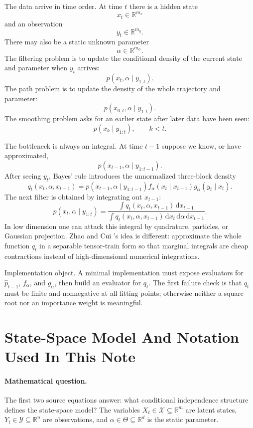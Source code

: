 \documentclass[11pt]{article}
\numberwithin{equation}{section}
\newcommand{\R}{\mathbb R}
\newcommand{\dd}{\,\mathrm d}
\begin{document}
The data arrive in time order.  At time \(t\) there is a hidden state
\[
    x_t\in \R^{m_x}
\]
and an observation
\[
    y_t\in \R^{m_y}.
\]
There may also be a static unknown parameter
\[
    \alpha\in \R^{m_\alpha}.
\]
The filtering problem is to update the conditional density of the current state
and parameter when \(y_t\) arrives:
\[
    p(x_t,\alpha\mid y_{1:t}).
\]
The path problem is to update the density of the whole trajectory and parameter:
\[
    p(x_{0:t},\alpha\mid y_{1:t}).
\]
The smoothing problem asks for an earlier state after later data have been seen:
\[
    p(x_k\mid y_{1:t}),\qquad k<t.
\]

The bottleneck is always an integral.  At time \(t-1\) suppose we know, or have
approximated,
\[
    p(x_{t-1},\alpha\mid y_{1:t-1}).
\]
After seeing \(y_t\), Bayes' rule introduces the unnormalized three-block
density
\[
    q_t(x_t,\alpha,x_{t-1})
    =
    p(x_{t-1},\alpha\mid y_{1:t-1})
    f_\alpha(x_t\mid x_{t-1})
    g_\alpha(y_t\mid x_t).
\]
The next filter is obtained by integrating out \(x_{t-1}\):
\[
    p(x_t,\alpha\mid y_{1:t})
    =
    \frac{\int q_t(x_t,\alpha,x_{t-1})\dd x_{t-1}}
    {\int q_t(x_t,\alpha,x_{t-1})\dd x_t\dd\alpha\dd x_{t-1}}.
\]
In low dimension one can attack this integral by quadrature, particles, or
Gaussian projection.  Zhao and Cui \cite{zhao2024ttsequential}'s idea is different: approximate the whole
function \(q_t\) in a separable tensor-train form so that marginal integrals are
cheap contractions instead of high-dimensional numerical integrations.

Implementation object.  A minimal implementation must expose evaluators for
\(\widehat p_{t-1}\), \(f_\alpha\), and \(g_\alpha\), then build an evaluator
for \(q_t\).  The first failure check is that \(q_t\) must be finite and
nonnegative at all fitting points; otherwise neither a square root nor an
importance weight is meaningful.

\section{State-Space Model And Notation Used In This Note}

\paragraph{Mathematical question.}
The first two source equations answer: what conditional independence structure
defines the state-space model?  The variables \(X_t\in\mathcal X\subseteq\R^m\)
are latent states, \(Y_t\in\mathcal Y\subseteq\R^n\) are observations, and
\(\alpha\in\Theta\subseteq\R^d\) is the static parameter.
\end{document}
